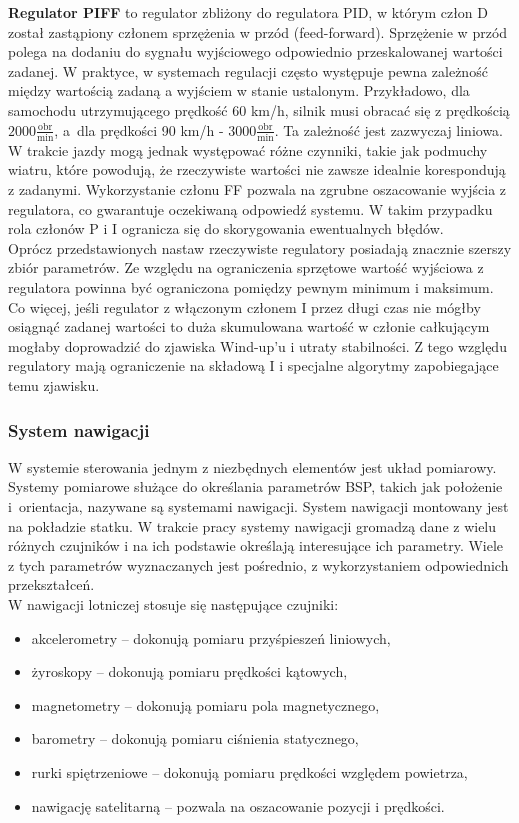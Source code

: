 \textbf{Regulator PIFF} to regulator zbliżony do regulatora PID, w którym człon D został zastąpiony członem sprzężenia w przód (feed-forward). Sprzężenie w przód polega na dodaniu do sygnału wyjściowego odpowiednio przeskalowanej wartości zadanej. W praktyce, w systemach regulacji często występuje pewna zależność między wartością zadaną a wyjściem w stanie ustalonym. Przykładowo, dla samochodu utrzymującego prędkość 60 km/h, silnik musi obracać się z prędkością $2000 \frac{\text{obr}}{\text{min}}$, a~dla prędkości 90 km/h - $3000 \frac{\text{obr}}{\text{min}}$. Ta zależność jest zazwyczaj liniowa. W trakcie jazdy mogą jednak występować różne czynniki, takie jak podmuchy wiatru, które powodują, że rzeczywiste wartości nie zawsze idealnie korespondują z zadanymi. Wykorzystanie członu FF pozwala na zgrubne oszacowanie wyjścia z regulatora, co gwarantuje oczekiwaną odpowiedź systemu. W takim przypadku rola członów P i I ogranicza się do skorygowania ewentualnych błędów. \\

Oprócz przedstawionych nastaw rzeczywiste regulatory posiadają znacznie szerszy zbiór parametrów. Ze względu na ograniczenia sprzętowe wartość wyjściowa z regulatora powinna być ograniczona pomiędzy pewnym minimum i maksimum. Co więcej, jeśli regulator z włączonym członem I przez długi czas nie mógłby osiągnąć zadanej wartości to duża skumulowana wartość w członie całkującym mogłaby doprowadzić do zjawiska Wind-up'u i utraty stabilności. Z tego względu regulatory mają ograniczenie na składową I i specjalne algorytmy zapobiegające temu zjawisku. 

\subsubsection{System nawigacji}

W systemie sterowania jednym z niezbędnych elementów jest układ pomiarowy. Systemy pomiarowe służące do określania parametrów BSP, takich jak położenie i~orientacja, nazywane są systemami nawigacji. System nawigacji montowany jest na pokładzie statku. W trakcie pracy systemy nawigacji gromadzą dane z wielu różnych czujników i na ich podstawie określają interesujące ich parametry. Wiele z tych parametrów wyznaczanych jest pośrednio, z wykorzystaniem odpowiednich przekształceń.\\

W nawigacji lotniczej stosuje się następujące czujniki:
\begin{itemize}
  \item akcelerometry -- dokonują pomiaru przyśpieszeń liniowych,
  \item żyroskopy -- dokonują pomiaru prędkości kątowych,
  \item magnetometry -- dokonują pomiaru pola magnetycznego,
  \item barometry -- dokonują pomiaru ciśnienia statycznego,
  \item rurki spiętrzeniowe -- dokonują pomiaru prędkości względem powietrza,
  \item nawigację satelitarną -- pozwala na oszacowanie pozycji i prędkości.
\end{itemize}

